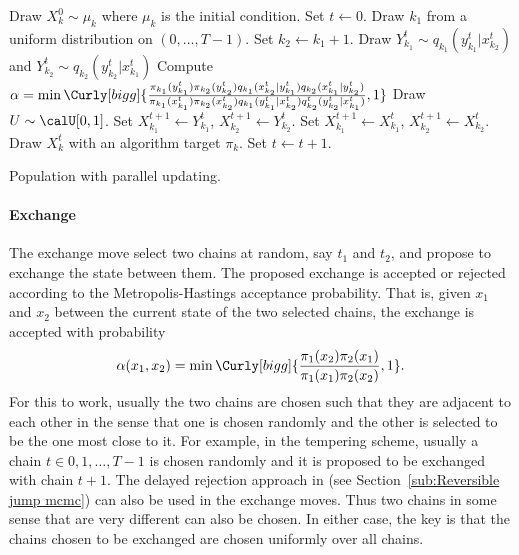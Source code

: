 \begin{algorithm}
\begin{algorithmic}
  \tophrule
    \STATE Draw $X_k^0\sim\mu_k$ where $\mu_k$ is the initial condition.
  \ENDFOR
  \STATE Set $t\leftarrow0$.
  \REPEAT
    \STATE Draw $k_1$ from a uniform distribution on $(0,\dots,T-1)$. Set
    $k_2\leftarrow k_1 + 1$.
    \STATE Draw $Y_{k_1}^t\sim q_{k_1}(y_{k_1}^t|x_{k_2}^t)$ and
    $Y_{k_2}^t\sim q_{k_2}(y_{k_2}^t|x_{k_1}^t)$
    \STATE Compute $\alpha = \min\Curly[bigg]{
      \frac{\pi_{k_1}(y_{k_1}^t)\pi_{k_2}(y_{k_2}^t)
        q_{k_1}(x_{k_2}^t|y_{k_1}^t)q_{k_2}(x_{k_1}^t|y_{k_2}^t)}
      {\pi_{k_1}(x_{k_1}^t)\pi_{k_2}(x_{k_2}^t)
        q_{k_1}(y_{k_1}^t|x_{k_2}^t)q_{k_2}^t(y_{k_2}^t|x_{k_1}^t)}, 1}$
    \STATE Draw $U\sim\calU[0,1]$.
      \STATE Set $X_{k_1}^{t+1}\leftarrow Y_{k_1}^t$, $X_{k_2}^{t+1}\leftarrow
          Y_{k_2}^t$.
    \ELSE
      \STATE Set $X_{k_1}^{t+1}\leftarrow X_{k_1}^t$, $X_{k_2}^{t+1}\leftarrow
          X_{k_2}^t$.
    \ENDIF
      \STATE Draw $X_k^t$ with an \mcmc algorithm target $\pi_k$.
    \ENDFOR
    \STATE Set $t\leftarrow t+1$.
  \bottomhrule
\end{algorithmic}
\caption{Population \mcmc with parallel updating.}
\label{alg:pmcmc}
\end{algorithm}

\paragraph{Exchange}

The exchange move select two chains at random, say $t_1$ and $t_2$, and
propose to exchange the state between them. The proposed exchange is accepted
or rejected according to the Metropolis-Hastings acceptance probability. That
is, given $x_1$ and $x_2$ between the current state of the two selected
chains, the exchange is accepted with probability
\begin{equation}
  \alpha(x_1, x_2) =
  \min\Curly[bigg]{\frac{\pi_1(x_2)\pi_2(x_1)}{\pi_1(x_1)\pi_2(x_2)}, 1}.
  \label{eq:exchange accept}
\end{equation}
For this to work, usually the two chains are chosen such that they are
adjacent to each other in the sense that one is chosen randomly and the other
is selected to be the one most close to it. For example, in the tempering
scheme, usually a chain $t\in{0,1,\dots,T-1}$ is chosen randomly and it is
proposed to be exchanged with chain $t+1$. The delayed rejection approach in
\cite{Green:2001tk} (see Section~\ref{sub:Reversible jump mcmc}) can also be
used in the exchange moves. Thus two chains in some sense that are very
different can also be chosen. In either case, the key is that the chains
chosen to be exchanged are chosen uniformly over all chains.

